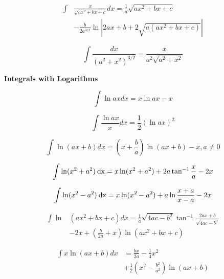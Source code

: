 \documentclass[11pt,twoside]{article}
\begin{document}
\begin{multicols}{3}
\begin{footnotesize}
\begin{align}
\int &\frac{x}{\sqrt{ax^2+bx+c}}dx=
\frac{1}{a}\sqrt{ax^2+bx + c} \nonumber \\&
-
\frac{b}{2a^{3/2}}\ln \left| 2ax+b + 2 \sqrt{a(ax^2+bx+c)} \right |
\end{align}

\begin{equation}
\int\frac{dx}{(a^2+x^2)^{3/2}}=\frac{x}{a^2\sqrt{a^2+x^2}}
\end{equation}

\columnbreak

\begin{center} \textbf{Integrals with Logarithms} \end{center}

\begin{equation}
\int \ln ax dx = x \ln ax - x 
\end{equation}

\begin{equation}
\int \frac{\ln ax}{x} dx = \frac{1}{2}\left ( \ln ax \right)^2 
\end{equation}

\begin{equation}
\int \ln (ax + b) dx = \left ( x + \frac{b}{a} \right) \ln (ax+b) - x , a\ne 0
\end{equation}

\begin{align}
\int \ln  ( x^2 + a^2 )\hspace{.5ex}\text{dx} = x \ln (x^2 + a^2  ) +2a\tan^{-1} \frac{x}{a} - 2x 
\end{align}

\begin{align}
\int \ln  ( x^2 - a^2 )\hspace{.5ex}\text{dx} = x \ln (x^2 - a^2  ) +a\ln \frac{x+a}{x-a} - 2x \end{align}

\begin{align}
\int \ln & \left ( ax^2 + bx + c\right) dx  = \frac{1}{a}\sqrt{4ac-b^2}\tan^{-1}\frac{2ax+b}{\sqrt{4ac-b^2}}
\nonumber \\ & -2x
 + \left( \frac{b}{2a}+x \right )\ln \left (ax^2+bx+c \right) 
\end{align}

\begin{align}
\int x \ln (ax + b) dx &= \frac{bx}{2a}-\frac{1}{4}x^2 \nonumber
\\&
+\frac{1}{2}\left(x^2-\frac{b^2}{a^2}\right)\ln (ax+b) 
\end{align}


\end{footnotesize}
\end{multicols}
\end{document}
